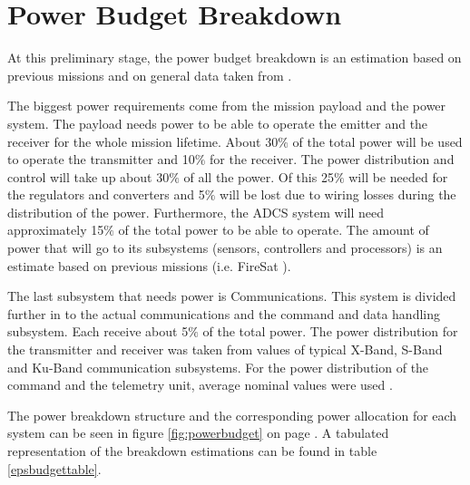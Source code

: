 \section{Power Budget Breakdown}
\label{blBudgetPower}

At this preliminary stage, the power budget breakdown is an estimation based on previous missions and on general data taken from \cite{larson}.

The biggest power requirements come from the mission payload and the power system. The payload needs power to be able to operate the emitter
and the receiver for the whole mission lifetime. About 30$\%$ of the total power will be used to operate the transmitter and 10$\%$ for the receiver. The power distribution and control will take up about 30$\%$ of all the power. Of this 25$\%$ will be needed for the regulators and converters and 5$\%$ will be lost due to wiring losses during the distribution of the power. Furthermore, the \ac{ADCS} system will need approximately 15$\%$ of the total power to be able to operate. The amount of power that will go to its subsystems (sensors, controllers and processors) is an estimate based on previous missions (i.e. FireSat \cite{larson}).

The last subsystem that needs power is Communications. This system is divided further in to the actual communications and the command and data handling subsystem. Each receive about 5$\%$ of the total power. The power distribution for the transmitter and receiver was taken from values of typical X-Band, S-Band and Ku-Band communication subsystems.
For the power distribution of the command and the telemetry unit, average nominal values were used \cite{larson}.

The power breakdown structure and the corresponding power allocation for each system can be seen in figure \ref{fig:powerbudget} on page \pageref{fig:powerbudget}. A tabulated representation of the breakdown estimations can be found in table \ref{epsbudgettable}.

